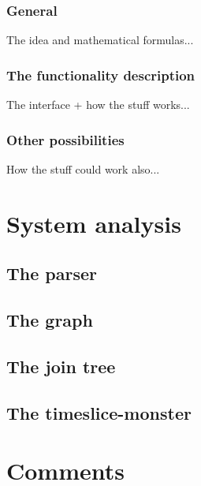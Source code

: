 \documentclass[12pt,a4paper]{report}
\begin{document}
\subsection{General}

The idea and mathematical formulas...

\subsection{The functionality description}

The interface + how the stuff works...

\subsection{Other possibilities}

How the stuff could work also...



\newpage
\chapter{System analysis}
\section{The parser}

\section{The graph}

\section{The join tree}

\section{The timeslice-monster}


\newpage
\chapter{Comments}


\newpage
%
\end{document}
